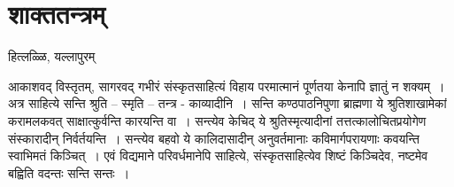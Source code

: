 {\fontsize{15}{17}\selectfont
\presetvalues
\chapter{शाक्ततन्त्रम्}

\begin{center}
\smallskip
हित्लळ्ळि, यल्लापुरम्
\addrule
\end{center}

आकाशवद् विस्तृतम्, सागरवद् गभीरं संस्कृतसाहित्यं विहाय परमात्मानं पूर्णतया केनापि ज्ञातुं न शक्यम्~। अत्र साहित्ये सन्ति श्रुति – स्मृति – तन्त्र - काव्यादीनि~। सन्ति कण्ठपाठनिपुणा ब्राह्मणा ये श्रुतिशाखामेकां करामलकवत् साक्षात्कुर्वन्ति कारयन्ति वा~। सन्त्येव केचिद् ये श्रुतिस्मृत्यादीनां तत्तत्कालोचितप्रयोगेण संस्कारादीन् निर्वर्तयन्ति~। सन्त्येव बहवो ये कालिदासादीन् अनुवर्तमानाः कविमार्गपरायणाः कवयन्ति स्वाभिमतं किञ्चित्~। एवं विद्यमाने परिवर्धमानेपि साहित्ये, संस्कृतसाहित्येव शिष्टं किञ्चिदेव, नष्टमेव बह्विति वदन्तः सन्ति सन्तः~। 

}

